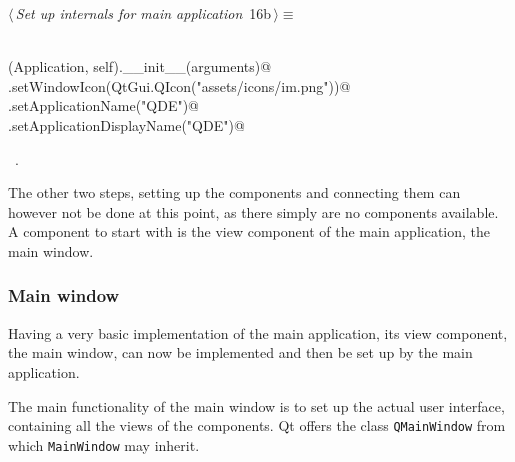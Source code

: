 \documentclass[
    a4paper,      %
    10pt,         %
    openright,    %
    notitlepage,  %
    parskip=half, %
]{scrreprt}       %
\theoremstyle{definition}                    %
\begin{document}
\begin{flushleft} \small
\begin{minipage}{\linewidth}\label{scrap4}\raggedright\small
{} $\langle\,${\itshape Set up internals for main application}\nobreak\ {\footnotesize {16b}}$\,\rangle\equiv$
\vspace{-1ex}
\begin{list}{}{} \item
\mbox{}\lstinline@@\\
\mbox{}\lstinline@super(Application, self).__init__(arguments)@\\
\mbox{}\lstinline@self.setWindowIcon(QtGui.QIcon("assets/icons/im.png"))@\\
\mbox{}\lstinline@self.setApplicationName("QDE")@\\
\mbox{}\lstinline@self.setApplicationDisplayName("QDE")@\\
\mbox{}\lstinline@@{\NWsep}
\end{list}
\vspace{-1.5ex}
\footnotesize
\begin{list}{}{\setlength{\itemsep}{-\parsep}\setlength{\itemindent}{-\leftmargin}}
\item \NWtxtMacroRefIn\ .

\item{}
\end{list}
\end{minipage}\vspace{4ex}
\end{flushleft}
The other two steps, setting up the components and connecting them can however
not be done at this point, as there simply are no components available. A
component to start with is the view component of the main application, the main
window.

\subsubsection{Main window}
\label{ssubsec:main-window}

Having a very basic implementation of the main application, its view component,
the main window, can now be implemented and then be set up by the main
application.

The main functionality of the main window is to set up the actual user
interface, containing all the views of the components. Qt offers the class
\verb+QMainWindow+ from which \verb=MainWindow= may inherit.
\end{document}
